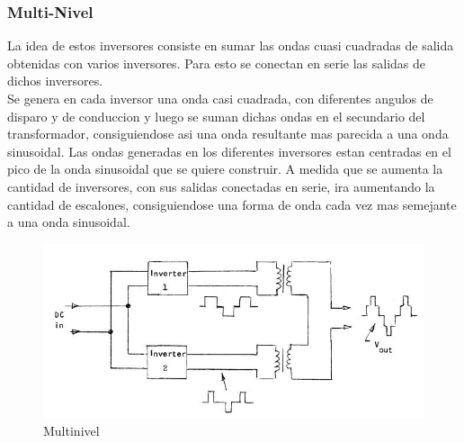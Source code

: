 \documentclass[11pt]{article}
\begin{document}
\subsubsection{Multi-Nivel}
La idea de estos inversores consiste en sumar las ondas cuasi cuadradas de salida obtenidas con varios inversores. Para esto se conectan en serie las salidas de dichos inversores.\\
Se genera en cada inversor una onda casi cuadrada, con diferentes angulos de disparo y de conduccion y luego se suman dichas ondas en el secundario del transformador, consiguiendose asi una onda resultante mas parecida a una onda sinusoidal.
Las ondas generadas en los diferentes inversores estan centradas en el pico de la onda sinusoidal que se quiere construir. A medida que se aumenta la cantidad de inversores, con sus salidas conectadas en serie, ira aumentando la cantidad de escalones, consiguiendose una forma de onda cada vez mas semejante a una onda sinusoidal.
\begin{figure}[htp]
\centering
\includegraphics[scale=0.70]{Multinivel.png}
\caption{Multinivel}
\label{}
\end{figure}
\end{document}
